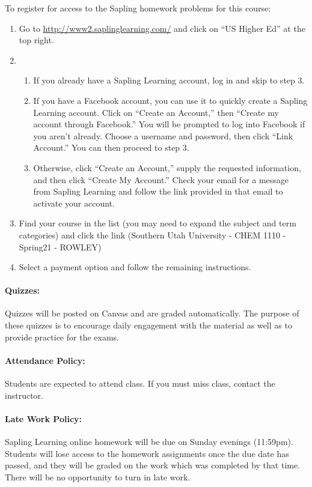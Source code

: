 \documentclass[12pt, letterpaper]{article}
\begin{document}
\noindent To register for access to the Sapling homework problems for this course:
\begin{enumerate}
  \item Go to \href{http://www2.saplinglearning.com/}{http://www2.saplinglearning.com/} and click on ``US Higher Ed'' at the top right.
  \item \begin{enumerate}
  \item If you already have a Sapling Learning account, log in and skip to step 3.
  \item If you have a Facebook account, you can use it to quickly create a Sapling Learning account. Click on ``Create an Account,'' then ``Create my account through Facebook.'' You will be prompted to log into Facebook if you aren't already. Choose a username and password, then click ``Link Account.'' You can then proceed to step 3.
  \item Otherwise, click ``Create an Account,'' supply the requested information, and then click ``Create My Account.'' Check your email for a message from Sapling Learning and follow the link provided in that email to activate your account.
  \end{enumerate}
  \item Find your course in the list (you may need to expand the subject and term categories) and click the link (Southern Utah University - CHEM 1110 - Spring21 - ROWLEY)
  \item Select a payment option and follow the remaining instructions.
\end{enumerate}

\paragraph{Quizzes:}
Quizzes will be posted on Canvas and are graded automatically. The purpose of these quizzes is to encourage daily engagement with the material as well as to provide practice for the exams.

\paragraph{Attendance Policy:}
Students are expected to attend class. If you must miss class, contact the instructor.

\paragraph{Late Work Policy:}
Sapling Learning online homework will be due on Sunday evenings (11:59pm). Students will lose access to the homework assignments once the due date has passed, and they will be graded on the work which was completed by that time. There will be no opportunity to turn in late work.
\end{document}
